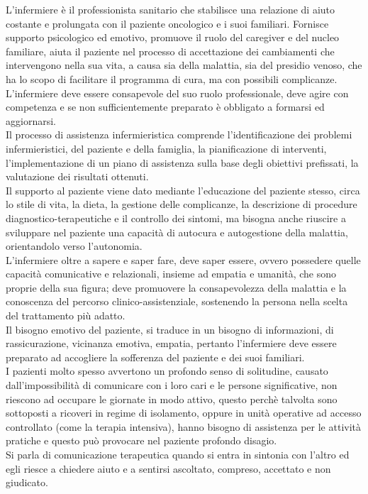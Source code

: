 L’infermiere è il professionista sanitario che stabilisce una relazione di aiuto costante e prolungata con 
il paziente oncologico e i suoi familiari. Fornisce supporto psicologico ed emotivo, promuove il ruolo del caregiver e del 
nucleo familiare, aiuta il paziente nel processo di accettazione dei cambiamenti 
che intervengono nella sua vita, a causa sia della malattia, sia del presidio venoso, che ha lo scopo di facilitare il 
programma di cura, ma con possibili complicanze\cite{COMUNICAZIONE}.\\
L’infermiere deve essere consapevole del suo ruolo professionale, deve agire con competenza e se non 
sufficientemente preparato è obbligato a formarsi ed aggiornarsi.\\
Il processo di assistenza infermieristica comprende l'identificazione dei problemi infermieristici, del paziente e 
della famiglia, la pianificazione di interventi, l’implementazione di un piano di assistenza sulla base degli 
obiettivi prefissati, la valutazione dei risultati ottenuti\cite{COMUNICAZIONE}.\\
Il supporto al paziente viene dato mediante l’educazione del paziente stesso, circa lo stile di vita, la dieta, la 
gestione delle complicanze, la descrizione di procedure diagnostico-terapeutiche e il controllo dei sintomi, ma bisogna 
anche riuscire a sviluppare nel paziente una capacità di autocura e autogestione della malattia, orientandolo 
verso l’autonomia\cite{NURSE24}.\\
L’infermiere oltre a sapere e saper fare, deve saper essere, ovvero possedere quelle capacità comunicative e 
relazionali, insieme ad empatia e umanità, che sono proprie della sua figura; deve promuovere la 
consapevolezza della malattia e la conoscenza del percorso clinico-assistenziale, sostenendo la persona nella 
scelta del trattamento più adatto\cite{COMUNICAZIONE}.\\
Il bisogno emotivo del paziente, si traduce in un bisogno di informazioni, di rassicurazione, vicinanza emotiva, 
empatia, pertanto l’infermiere deve essere preparato ad accogliere la sofferenza del paziente e dei suoi familiari\cite{NURSE24}.\\
I pazienti molto spesso avvertono un profondo senso di solitudine, causato dall’impossibilità di comunicare con i 
loro cari e le persone significative, non riescono ad occupare le giornate in modo attivo, questo 
perchè talvolta sono sottoposti a ricoveri in regime di isolamento, oppure in unità operative ad accesso controllato 
(come la terapia intensiva), hanno bisogno di assistenza per le attività pratiche e questo può provocare 
nel paziente profondo disagio\cite{NURSE24}.\\
Si parla di comunicazione terapeutica quando si entra in sintonia con l’altro ed egli riesce a chiedere aiuto e a 
sentirsi ascoltato, compreso, accettato e non giudicato.

